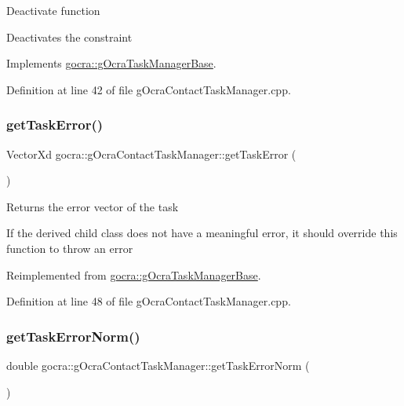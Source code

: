 Deactivate function

Deactivates the constraint 

Implements \hyperlink{classgocra_1_1gOcraTaskManagerBase_a7cf9111e69aee47a39fe0f2976a20d6c}{gocra\+::g\+Ocra\+Task\+Manager\+Base}.



Definition at line 42 of file g\+Ocra\+Contact\+Task\+Manager.\+cpp.

\hypertarget{classgocra_1_1gOcraContactTaskManager_a50ef70ceb95ced6818a5990fa6615d6a}{}\label{classgocra_1_1gOcraContactTaskManager_a50ef70ceb95ced6818a5990fa6615d6a} 
\subsubsection{\texorpdfstring{get\+Task\+Error()}{getTaskError()}}
{\footnotesize\ttfamily Vector\+Xd gocra\+::g\+Ocra\+Contact\+Task\+Manager\+::get\+Task\+Error (\begin{DoxyParamCaption}{ }\end{DoxyParamCaption})\hspace{0.3cm}{\ttfamily [virtual]}}

Returns the error vector of the task

If the derived child class does not have a meaningful error, it should override this function to throw an error 

Reimplemented from \hyperlink{classgocra_1_1gOcraTaskManagerBase_a5c40a14b3a1d5a6519da422310d28f97}{gocra\+::g\+Ocra\+Task\+Manager\+Base}.



Definition at line 48 of file g\+Ocra\+Contact\+Task\+Manager.\+cpp.

\hypertarget{classgocra_1_1gOcraContactTaskManager_af7865eaf5c86bca10e8911a23cceaf2a}{}\label{classgocra_1_1gOcraContactTaskManager_af7865eaf5c86bca10e8911a23cceaf2a} 
\subsubsection{\texorpdfstring{get\+Task\+Error\+Norm()}{getTaskErrorNorm()}}
{\footnotesize\ttfamily double gocra\+::g\+Ocra\+Contact\+Task\+Manager\+::get\+Task\+Error\+Norm (\begin{DoxyParamCaption}{ }\end{DoxyParamCaption})}



